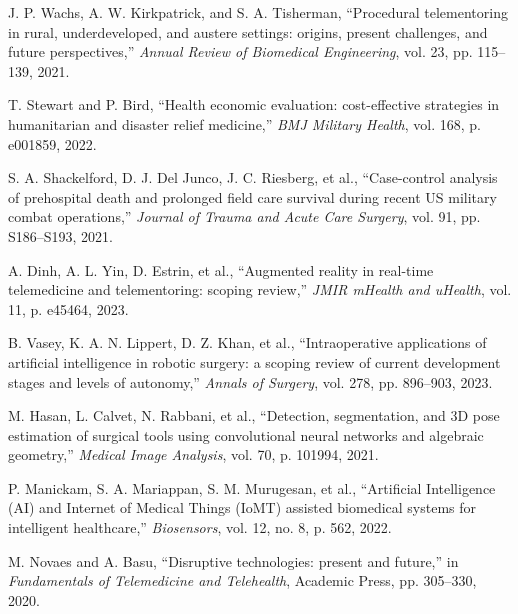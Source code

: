 \documentclass[12pt,a4paper]{report}
\begin{document}
\begin{enumerate}[label={[\arabic*]}, leftmargin=2.5em, itemsep=0.8em]
    \item J. P. Wachs, A. W. Kirkpatrick, and S. A. Tisherman, ``Procedural telementoring in rural, underdeveloped, and austere settings: origins, present challenges, and future perspectives,'' \textit{Annual Review of Biomedical Engineering}, vol. 23, pp. 115--139, 2021.
    
    \item T. Stewart and P. Bird, ``Health economic evaluation: cost-effective strategies in humanitarian and disaster relief medicine,'' \textit{BMJ Military Health}, vol. 168, p. e001859, 2022.
    
    \item S. A. Shackelford, D. J. Del Junco, J. C. Riesberg, et al., ``Case-control analysis of prehospital death and prolonged field care survival during recent US military combat operations,'' \textit{Journal of Trauma and Acute Care Surgery}, vol. 91, pp. S186--S193, 2021.
    
    \item A. Dinh, A. L. Yin, D. Estrin, et al., ``Augmented reality in real-time telemedicine and telementoring: scoping review,'' \textit{JMIR mHealth and uHealth}, vol. 11, p. e45464, 2023.
    
    \item B. Vasey, K. A. N. Lippert, D. Z. Khan, et al., ``Intraoperative applications of artificial intelligence in robotic surgery: a scoping review of current development stages and levels of autonomy,'' \textit{Annals of Surgery}, vol. 278, pp. 896--903, 2023.
    
    \item M. Hasan, L. Calvet, N. Rabbani, et al., ``Detection, segmentation, and 3D pose estimation of surgical tools using convolutional neural networks and algebraic geometry,'' \textit{Medical Image Analysis}, vol. 70, p. 101994, 2021.
    
    \item P. Manickam, S. A. Mariappan, S. M. Murugesan, et al., ``Artificial Intelligence (AI) and Internet of Medical Things (IoMT) assisted biomedical systems for intelligent healthcare,'' \textit{Biosensors}, vol. 12, no. 8, p. 562, 2022.
    
    \item M. Novaes and A. Basu, ``Disruptive technologies: present and future,'' in \textit{Fundamentals of Telemedicine and Telehealth}, Academic Press, pp. 305--330, 2020.
    

\end{enumerate}
\end{document}
